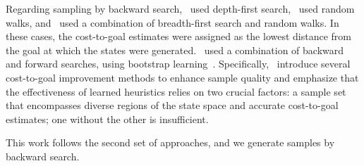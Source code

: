 \documentclass[ppgc,diss,english]{iiufrgs}
\begin{document}

Regarding sampling by backward search,~\citet{Yu.etal/2020} used depth-first search,~\citet{OToole/2022} used random walks, and~\citet{Bettker.etal/2022} used a combination of breadth-first search and random walks. In these cases, the cost-to-goal estimates were assigned as the lowest distance from the goal at which the states were generated.~\citet{Ferber.etal/2022} used a combination of backward and forward searches, using bootstrap learning~\cite{Arfaee.etal/2011}.
Specifically,~\citet{Bettker.etal/2022} introduce several cost-to-goal improvement methods to enhance sample quality and emphasize that the effectiveness of learned heuristics relies on two crucial factors: a sample set that encompasses diverse regions of the state space and accurate cost-to-goal estimates; one without the other is insufficient.

This work follows the second set of approaches, and we generate samples by backward search.




%
%
\end{document}
